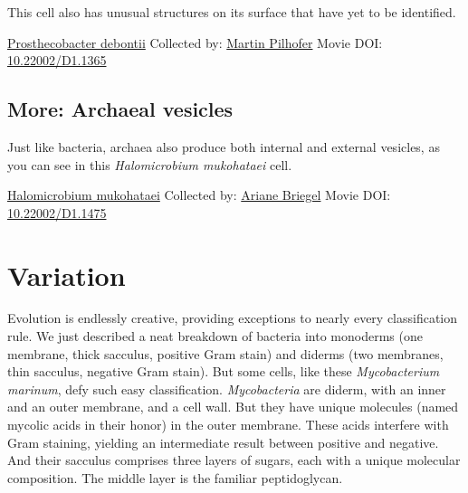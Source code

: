 \documentclass[]{tufte-book}
\begin{document}
This cell also has unusual structures on its surface that have yet to be identified.



\hypertarget{htmlwidget-347e40fb21ccb1603c8a}{}

\label{fig:2-4d}\protect\hyperlink{tree}{Prosthecobacter debontii} Collected by: \protect\hyperlink{martin_pilhofer}{Martin Pilhofer} Movie DOI: \href{https://doi.org/10.22002/D1.1365}{10.22002/D1.1365}

\hypertarget{Archaeal_vesicles}{%
\subsection*{More: Archaeal vesicles}\label{Archaeal_vesicles}}

Just like bacteria, archaea also produce both internal and external vesicles, as you can see in this \emph{Halomicrobium mukohataei} cell.



\hypertarget{htmlwidget-c78173b12ed7499a6f5c}{}

\label{fig:2-4e}\protect\hyperlink{tree}{Halomicrobium mukohataei} Collected by: \protect\hyperlink{ariane_briegel}{Ariane Briegel} Movie DOI: \href{https://doi.org/10.22002/D1.1475}{10.22002/D1.1475}

\hypertarget{variation}{%
\section{Variation}\label{variation}}

Evolution is endlessly creative, providing exceptions to nearly every classification rule. We just described a neat breakdown of bacteria into monoderms (one membrane, thick sacculus, positive Gram stain) and diderms (two membranes, thin sacculus, negative Gram stain). But some cells, like these \emph{Mycobacterium marinum}, defy such easy classification. \emph{Mycobacteria} are diderm, with an inner and an outer membrane, and a cell wall. But they have unique molecules (named mycolic acids in their honor) in the outer membrane. These acids interfere with Gram staining, yielding an intermediate result between positive and negative. And their sacculus comprises three layers of sugars, each with a unique molecular composition. The middle layer is the familiar peptidoglycan.
\end{document}

